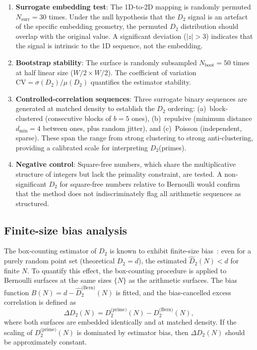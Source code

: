 \documentclass[final,1p,times]{elsarticle}
\theoremstyle{definition}
\begin{document}
\begin{enumerate}
  \item \textbf{Surrogate embedding test}: The 1D-to-2D mapping is
        randomly permuted $N_{\text{surr}} = 30$ times. Under the null
        hypothesis that the $D_2$ signal is an artefact of the specific
        embedding geometry, the permuted $D_2$ distribution should
        overlap with the original value. A significant deviation
        ($|z| > 3$) indicates that the signal is intrinsic to the 1D
        sequence, not the embedding.
  \item \textbf{Bootstrap stability}: The surface is randomly
        subsampled $N_{\text{boot}} = 50$ times at half linear size
        ($W/2 \times W/2$). The coefficient of variation
        $\text{CV} = \sigma(D_2)/\mu(D_2)$ quantifies the estimator
        stability.
  \item \textbf{Controlled-correlation sequences}: Three surrogate
        binary sequences are generated at matched density to establish
        the $D_2$ ordering: (a)~block-clustered (consecutive blocks of
        $b=5$ ones), (b)~repulsive (minimum distance $d_{\min}=4$
        between ones, plus random jitter), and (c)~Poisson
        (independent, sparse). These span the range from strong
        clustering to strong anti-clustering, providing a calibrated
        scale for interpreting $D_2$(primes).
  \item \textbf{Negative control}: Square-free numbers, which share
        the multiplicative structure of integers but lack the primality
        constraint, are tested. A non-significant $D_2$ for square-free
        numbers relative to Bernoulli would confirm that the method does
        not indiscriminately flag all arithmetic sequences as structured.
\end{enumerate}

\subsection{Finite-size bias analysis}
\label{sec:bias}

The box-counting estimator of $D_2$ is known to exhibit finite-size
bias~\cite{GRASSBERGER-PROCACCIA-1983, THEILER-1986}: even for a purely
random point set (theoretical $D_2 = d$), the estimated
$\hat{D}_2(N) < d$ for finite $N$. To quantify this effect, the
box-counting procedure is applied to Bernoulli surfaces at the same
sizes $\{N\}$ as the arithmetic surfaces. The bias function
$B(N) = d - \hat{D}_2^{\text{(Bern)}}(N)$ is fitted, and the
bias-cancelled excess correlation is defined as
\begin{equation}
  \Delta D_2(N) = D_2^{\text{(prime)}}(N) - D_2^{\text{(Bern)}}(N),
  \label{eq:delta}
\end{equation}
where both surfaces are embedded identically and at matched density.
If the scaling of $D_2^{\text{(prime)}}(N)$ is dominated by estimator
bias, then $\Delta D_2(N)$ should be approximately constant.
\end{document}
